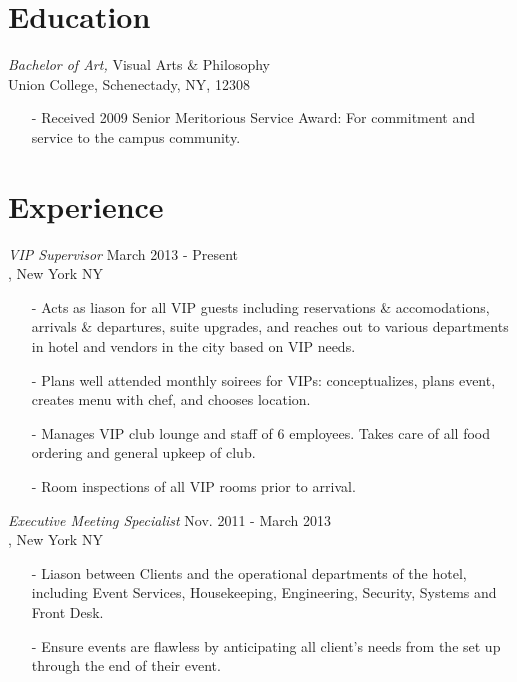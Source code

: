 \documentclass[margin, 10pt]{res} %
\begin{document}
\begin{resume}


\section{Education}

{\sl Bachelor of Art,} Visual Arts \& Philosophy \\
Union College, Schenectady, NY, 12308 \\
\vspace{-10pt}
\begin{itemize} \itemsep -2pt
\item[-] Received 2009 Senior Meritorious Service Award: For commitment and service to the campus community.
\end{itemize}
 
 
\section{Experience}

{\sl VIP Supervisor} \hfill March 2013 - Present \\
\sheraton, New York NY
\begin{itemize} \itemsep -2pt
\item[-] Acts as liason for all VIP guests including reservations \& accomodations, arrivals \& departures, suite upgrades, and reaches out to various departments in hotel and vendors in the city based on VIP needs.
\item[-] Plans well attended monthly soirees for VIPs: conceptualizes, plans event, creates menu with chef, and chooses location.
\item[-] Manages VIP club lounge and staff of 6 employees. Takes care of all food ordering and general upkeep of club.
\item[-] Room inspections of all VIP rooms prior to arrival.
\end{itemize}

{\sl Executive Meeting Specialist} \hfill Nov. 2011 - March 2013\\
\sheraton, New York NY
\begin{itemize} \itemsep -2pt
\item[-] Liason between Clients and the operational departments of the hotel, including Event Services, Housekeeping, Engineering, Security, Systems and Front Desk.
\item[-] Ensure events are flawless by anticipating all client's needs from the set up through the end of their event.
\end{itemize}


\end{resume}
\end{document}
